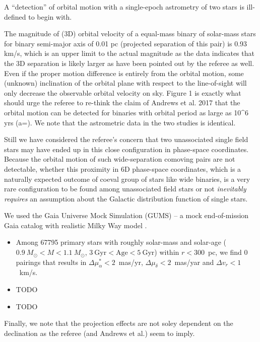 \documentclass[12pt]{article}
\begin{document}
A ``detection'' of orbital motion with a single-epoch astrometry of two
stars is ill-defined to begin with.

The magnitude of (3D) orbital velocity of a equal-mass binary of solar-mass
stars for binary semi-major axis of 0.01 pc (projected separation of this pair)
is 0.93 km/s,
which is an upper limit to the actual magnitude as the data
indicates that the 3D separation is likely larger as have been pointed
out by the referee as well.
Even if the proper motion difference is entirely from the orbital motion, some
(unknown) inclination of the orbital plane with respect to the line-of-sight
will only decrease the observable orbital velocity on sky.
Figure 1 is exactly what should urge the referee to re-think the claim of
Andrews et al. 2017 that the orbital motion can be detected for binaries with
orbital period as large as 10\^{}6 yrs (a=).
We note that the astrometric data in the two studies is identical.

Still we have considered the referee's concern that two unassociated
single field stars may have ended up in this close configuration in
phase-space coordinates. Because the orbital motion of such
wide-separation comoving pairs are not detectable, whether this
proximity in 6D phase-space coordinates, which is a naturally expected
outcome of coeval group of stars like wide binaries, is a very rare
configuration to be found among unassociated field stars or not
\emph{inevitably requires} an assumption about the Galactic distribution
function of single stars.

We used the Gaia Universe Mock Simulation (GUMS) -- a mock
end-of-mission Gaia catalog with realistic Milky Way model \citep{gums}.

\begin{itemize}
\item Among 67795 primary stars with roughly solar-mass and solar-age ($0.9~M_\odot< M <
  1.1~M_\odot$, $3~\mathrm{Gyr}<\mathrm{Age} < 5~\mathrm{Gyr}$) within $r<300$~pc, we find 0
  pairings that results in $\Delta \mu_\alpha^* < 2$~mas/yr, $\Delta
  \mu_\delta<2$~mas/yar and $\Delta v_r < 1$~km/s.
\item TODO
\item TODO
\end{itemize}



Finally, we note that the projection effects are not soley dependent on the
declination as the referee (and Andrews et al.) seem to imply.
\end{document}
